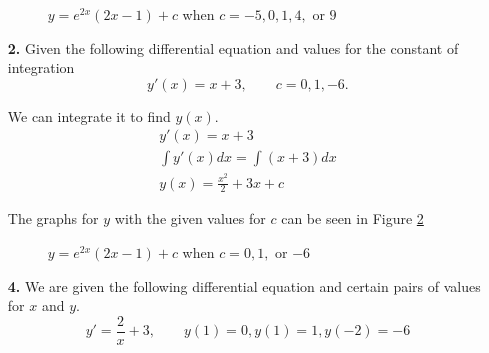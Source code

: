 \begin{enumerate}
\begin{figure}[htb]
			\caption{\(y = e^{2x} (2x-1) + c\) when \(c = -5, 0, 1, 4,\) or \(9\)}
			\label{q1b1}
		\end{figure}

	\item[\textbf{2.}] %
		Given the following differential equation and values for the constant of integration
		\[y'(x) = x + 3, \qquad c= 0, 1, -6.\]

		We can integrate it to find \(y(x)\).
		\begin{gather*}
			y'(x) = x + 3\\
			\int y'(x) dx = \int (x + 3) dx\\
			y(x) = \frac{x^2}{2} + 3x + c
		\end{gather*}

		The graphs for \(y\) with the given values for \(c\) can be seen in Figure \ref{q1b2}

		\begin{figure}[htb]
			\centering
			\caption{\(y = e^{2x} (2x-1) + c\) when \(c = 0, 1,\) or \(-6\)}
			\label{q1b2}
		\end{figure}


	\item[\textbf{4.}] %
		We are given the following differential equation and certain pairs of values for \(x\) and \(y\).
		\[y'=\frac{2}{x} + 3,  \qquad y(1) = 0, y(1) = 1, y(-2) =-6\]


\end{enumerate}
